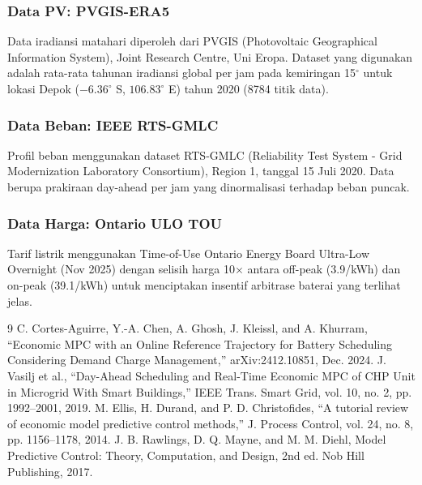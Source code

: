 \documentclass{article}
\begin{document}
\subsubsection{Data PV: PVGIS-ERA5}

Data iradiansi matahari diperoleh dari PVGIS (Photovoltaic Geographical Information System), Joint Research Centre, Uni Eropa. Dataset yang digunakan adalah rata-rata tahunan iradiansi global per jam pada kemiringan 15$^\circ$ untuk lokasi Depok ($-6.36^\circ$ S, $106.83^\circ$ E) tahun 2020 (8784 titik data).

\subsubsection{Data Beban: IEEE RTS-GMLC}

Profil beban menggunakan dataset RTS-GMLC (Reliability Test System - Grid Modernization Laboratory Consortium), Region 1, tanggal 15 Juli 2020. Data berupa prakiraan day-ahead per jam yang dinormalisasi terhadap beban puncak.

\subsubsection{Data Harga: Ontario ULO TOU}

Tarif listrik menggunakan Time-of-Use Ontario Energy Board Ultra-Low Overnight (Nov 2025) dengan selisih harga 10$\times$ antara off-peak (3.9{\textcent}/kWh) dan on-peak (39.1{\textcent}/kWh) untuk menciptakan insentif arbitrase baterai yang terlihat jelas.

\begin{thebibliography}{9}
 C. Cortes-Aguirre, Y.-A. Chen, A. Ghosh, J. Kleissl, and A. Khurram, ``Economic MPC with an Online Reference Trajectory for Battery Scheduling Considering Demand Charge Management,'' arXiv:2412.10851, Dec. 2024.
 J. Vasilj et al., ``Day-Ahead Scheduling and Real-Time Economic MPC of CHP Unit in Microgrid With Smart Buildings,'' IEEE Trans. Smart Grid, vol. 10, no. 2, pp. 1992--2001, 2019.
 M. Ellis, H. Durand, and P. D. Christofides, ``A tutorial review of economic model predictive control methods,'' J. Process Control, vol. 24, no. 8, pp. 1156--1178, 2014.
 J. B. Rawlings, D. Q. Mayne, and M. M. Diehl, Model Predictive Control: Theory, Computation, and Design, 2nd ed. Nob Hill Publishing, 2017.
\end{thebibliography}
\end{document}
